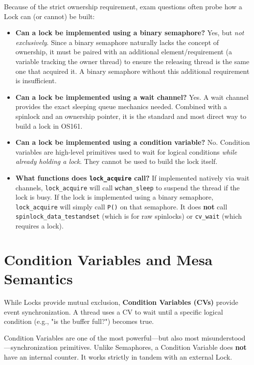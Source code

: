 \begin{tcolorbox}[colback=blue!5!white,colframe=blue!75!black,title=Exam Insight: Lock Implementation Details (e.g. Q24-Q26)]
Because of the strict ownership requirement, exam questions often probe how a Lock can (or cannot) be built:
\begin{itemize}
    \item \textbf{Can a lock be implemented using a binary semaphore?} Yes, but \textit{not exclusively}. Since a binary semaphore naturally lacks the concept of ownership, it must be paired with an additional element/requirement (a variable tracking the owner thread) to ensure the releasing thread is the same one that acquired it. A binary semaphore without this additional requirement is insufficient.
    \item \textbf{Can a lock be implemented using a wait channel?} Yes. A wait channel provides the exact sleeping queue mechanics needed. Combined with a spinlock and an ownership pointer, it is the standard and most direct way to build a lock in OS161.
    \item \textbf{Can a lock be implemented using a condition variable?} No. Condition variables are high-level primitives used to wait for logical conditions \textit{while already holding a lock}. They cannot be used to build the lock itself.
    \item \textbf{What functions does \texttt{lock\_acquire} call?} If implemented natively via wait channels, \texttt{lock\_acquire} will call \texttt{wchan\_sleep} to suspend the thread if the lock is busy. If the lock is implemented using a binary semaphore, \texttt{lock\_acquire} will simply call \texttt{P()} on that semaphore. It does \textbf{not} call \texttt{spinlock\_data\_testandset} (which is for raw spinlocks) or \texttt{cv\_wait} (which requires a lock).
\end{itemize}
\end{tcolorbox}

\section{Condition Variables and Mesa Semantics}
While Locks provide mutual exclusion, \textbf{Condition Variables (CVs)} provide event synchronization. A thread uses a CV to wait until a specific logical condition (e.g., "is the buffer full?") becomes true.

Condition Variables are one of the most powerful—but also most misunderstood—synchronization primitives. Unlike Semaphores, a Condition Variable does \textbf{not} have an internal counter. It works strictly in tandem with an external Lock.

